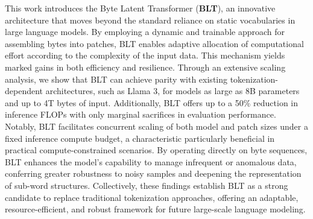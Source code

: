 This work introduces the Byte Latent Transformer (\textbf{BLT}), an innovative architecture that moves beyond the standard reliance on static vocabularies in large language models. By employing a dynamic and trainable approach for assembling bytes into patches, {\textsc BLT} enables adaptive allocation of computational effort according to the complexity of the input data. This mechanism yields marked gains in both efficiency and resilience. Through an extensive scaling analysis, we show that {\textsc BLT} can achieve parity with existing tokenization-dependent architectures, such as Llama 3, for models as large as 8B parameters and up to 4T bytes of input. Additionally, {\textsc BLT} offers up to a 50\% reduction in inference FLOPs with only marginal sacrifices in evaluation performance. Notably, {\textsc BLT} facilitates concurrent scaling of both model and patch sizes under a fixed inference compute budget, a characteristic particularly beneficial in practical compute-constrained scenarios. By operating directly on byte sequences, {\textsc BLT} enhances the model’s capability to manage infrequent or anomalous data, conferring greater robustness to noisy samples and deepening the representation of sub-word structures. Collectively, these findings establish {\textsc BLT} as a strong candidate to replace traditional tokenization approaches, offering an adaptable, resource-efficient, and robust framework for future large-scale language modeling.


